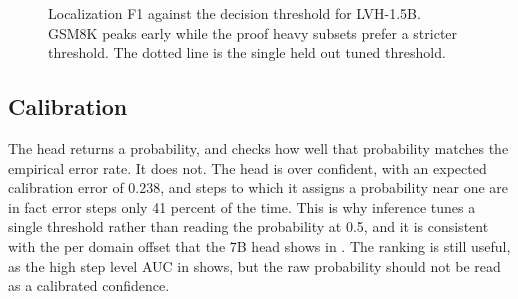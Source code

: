 \begin{figure}[h]
  \centering
  \caption{Localization F1 against the decision threshold for LVH-1.5B. GSM8K peaks early while the proof heavy subsets prefer a stricter threshold. The dotted line is the single held out tuned threshold.}
  \label{fig:thrsweep}
\end{figure}

\subsection{Calibration}
\label{app:calibration}

The head returns a probability, and  checks how well that probability matches the empirical error rate. It does not. The head is over confident, with an expected calibration error of 0.238, and steps to which it assigns a probability near one are in fact error steps only 41 percent of the time. This is why inference tunes a single threshold rather than reading the probability at 0.5, and it is consistent with the per domain offset that the 7B head shows in . The ranking is still useful, as the high step level AUC in  shows, but the raw probability should not be read as a calibrated confidence.

